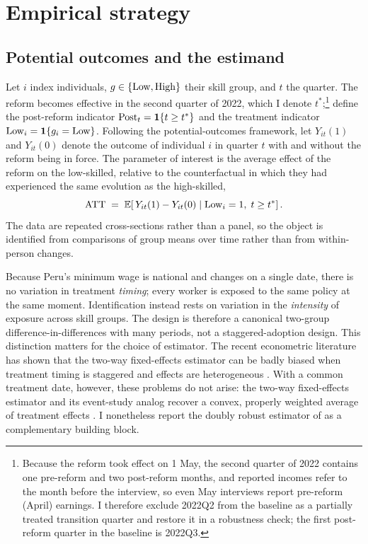 \section{Empirical strategy}\label{sec:strategy}

\subsection{Potential outcomes and the estimand}

Let $i$ index individuals, $g\in\{\mathrm{Low},\mathrm{High}\}$ their skill group, and $t$ the quarter. The reform becomes effective in the second quarter of 2022, which I denote $t^{\ast}$;\footnote{Because the reform took effect on 1 May, the second quarter of 2022 contains one pre-reform and two post-reform months, and reported incomes refer to the month before the interview, so even May interviews report pre-reform (April) earnings. I therefore exclude 2022Q2 from the baseline as a partially treated transition quarter and restore it in a robustness check; the first post-reform quarter in the baseline is 2022Q3.} define the post-reform indicator $\mathrm{Post}_t=\mathbf{1}\{t\ge t^{\ast}\}$ and the treatment indicator $\mathrm{Low}_i=\mathbf{1}\{g_i=\mathrm{Low}\}$. Following the potential-outcomes framework, let $Y_{it}(1)$ and $Y_{it}(0)$ denote the outcome of individual $i$ in quarter $t$ with and without the reform being in force. The parameter of interest is the average effect of the reform on the low-skilled, relative to the counterfactual in which they had experienced the same evolution as the high-skilled,
\begin{equation}
\mathrm{ATT} \;=\; \mathbb{E}\!\left[\,Y_{it}(1)-Y_{it}(0)\;\middle|\;\mathrm{Low}_i=1,\;t\ge t^{\ast}\right].
\end{equation}
The data are repeated cross-sections rather than a panel, so the object is identified from comparisons of group means over time rather than from within-person changes.

Because Peru's minimum wage is national and changes on a single date, there is no variation in treatment \emph{timing}; every worker is exposed to the same policy at the same moment. Identification instead rests on variation in the \emph{intensity} of exposure across skill groups. The design is therefore a canonical two-group difference-in-differences with many periods, not a staggered-adoption design. This distinction matters for the choice of estimator. The recent econometric literature has shown that the two-way fixed-effects estimator can be badly biased when treatment timing is staggered and effects are heterogeneous \citep{goodmanbacon_2021, dechaisemartin_2020, sun_abraham_2021, callaway_santanna_2021}. With a common treatment date, however, these problems do not arise: the two-way fixed-effects estimator and its event-study analog recover a convex, properly weighted average of treatment effects \citep{roth_2023_trending, baker_larcker_wang_2022}. I nonetheless report the doubly robust estimator of \citet{santanna_zhao_2020} as a complementary building block.

